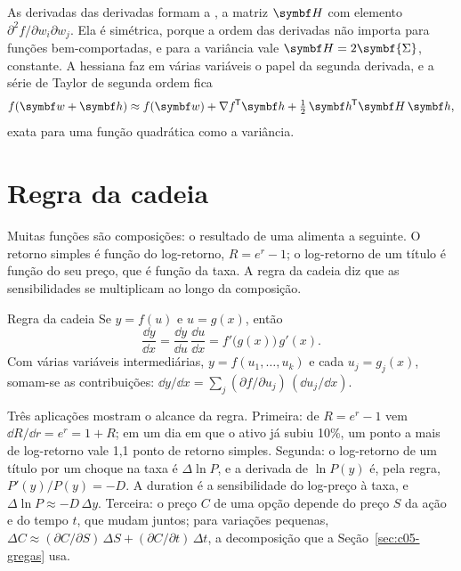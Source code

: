 
As derivadas das derivadas formam a , a matriz $\vetor{H}$ com elemento $\partial^2 f/\partial w_i \partial w_j$. Ela é simétrica, porque a ordem das derivadas não importa para funções bem-comportadas, e para a variância vale $\vetor{H} = 2\symbf{\Sigma}$, constante. A hessiana faz em várias variáveis o papel da segunda derivada, e a série de Taylor de segunda ordem fica
\begin{equation}
  f(\vetor{w} + \vetor{h}) \approx f(\vetor{w}) + \nabla f\T\vetor{h} + \tfrac12\,\vetor{h}\T\vetor{H}\,\vetor{h} ,
  \label{eq:c05-taylor-n}
\end{equation}
exata para uma função quadrática como a variância.

\section{Regra da cadeia}
\label{sec:c05-cadeia}

Muitas funções são composições: o resultado de uma alimenta a seguinte. O retorno simples é função do log-retorno, $R = e^{r} - 1$; o log-retorno de um título é função do seu preço, que é função da taxa. A regra da cadeia diz que as sensibilidades se multiplicam ao longo da composição.

\begin{resultado}{Regra da cadeia}
Se $y = f(u)$ e $u = g(x)$, então
\begin{equation}
  \frac{\dd y}{\dd x} = \frac{\dd y}{\dd u}\,\frac{\dd u}{\dd x} = f'\big(g(x)\big)\,g'(x) .
  \label{eq:c05-cadeia}
\end{equation}
Com várias variáveis intermediárias, $y = f(u_1, \dots, u_k)$ e cada $u_j = g_j(x)$, somam-se as contribuições: $\dd y/\dd x = \sum_j (\partial f/\partial u_j)\,(\dd u_j/\dd x)$.
\end{resultado}

Três aplicações mostram o alcance da regra. Primeira: de $R = e^{r} - 1$ vem $\dd R/\dd r = e^{r} = 1 + R$; em um dia em que o ativo já subiu 10\%, um ponto a mais de log-retorno vale 1,1 ponto de retorno simples. Segunda: o log-retorno de um título por um choque na taxa é $\Delta \ln P$, e a derivada de $\ln P(y)$ é, pela regra, $P'(y)/P(y) = -D$. A duration é a sensibilidade do log-preço à taxa, e $\Delta \ln P \approx -D\,\Delta y$. Terceira: o preço $C$ de uma opção depende do preço $S$ da ação e do tempo $t$, que mudam juntos; para variações pequenas, $\Delta C \approx (\partial C/\partial S)\,\Delta S + (\partial C/\partial t)\,\Delta t$, a decomposição que a Seção~\ref{sec:c05-gregas} usa.

